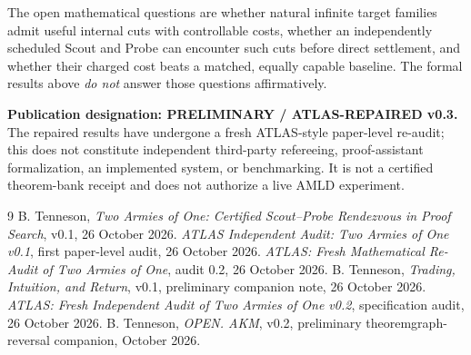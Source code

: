 \documentclass[11pt,letterpaper]{article}
\theoremstyle{definition}
\begin{document}
The open mathematical questions are whether natural infinite target families
admit useful internal cuts with controllable costs, whether an independently
scheduled Scout and Probe can encounter such cuts before direct settlement,
and whether their charged cost beats a matched, equally capable baseline.
The formal results above \emph{do not} answer those questions affirmatively.

\textbf{Publication designation: PRELIMINARY / ATLAS-REPAIRED v0.3.}
The repaired results have undergone a fresh ATLAS-style paper-level
re-audit; this does not constitute independent third-party refereeing,
proof-assistant formalization, an implemented system, or benchmarking. It is not a certified theorem-bank
receipt and does not authorize a live AMLD experiment.

\begin{thebibliography}{9}\setlength{\itemsep}{1.5pt}
 B. Tenneson, \emph{Two Armies of One: Certified Scout--Probe Rendezvous in Proof Search}, v0.1, 26 October 2026.
 \emph{ATLAS Independent Audit: Two Armies of One v0.1}, first paper-level audit, 26 October 2026.
 \emph{ATLAS: Fresh Mathematical Re-Audit of Two Armies of One}, audit 0.2, 26 October 2026.
 B. Tenneson, \emph{Trading, Intuition, and Return}, v0.1, preliminary companion note, 26 October 2026.
 \emph{ATLAS: Fresh Independent Audit of Two Armies of One v0.2}, specification audit, 26 October 2026.
 B. Tenneson, \emph{OPEN. AKM}, v0.2, preliminary theoremgraph-reversal companion, October 2026.
\end{thebibliography}
\end{document}
